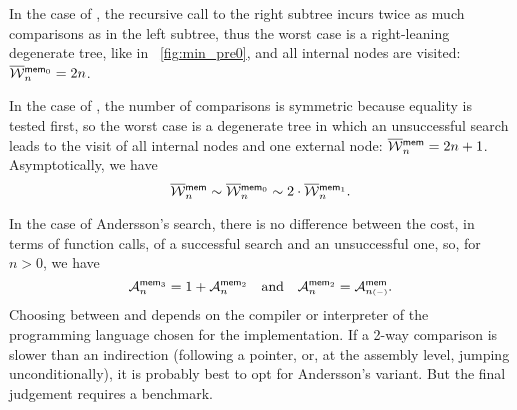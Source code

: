 In the case of , the recursive call to the right
subtree incurs twice as much comparisons as in the left subtree, thus
the worst case is a right\hyp{}leaning degenerate tree, like in
\fig~\vref{fig:min_pre0}, and all internal nodes are visited:
\(\OW{\fun{mem}_0}{n} = 2n\).

In the case of , the number of comparisons is symmetric
because equality is tested first, so the worst case is a degenerate
tree in which an unsuccessful search leads to the visit of all
internal nodes and one external node: \(\OW{\fun{mem}}{n} = 2n +
1\). Asymptotically, we have
\begin{equation*}
\OW{\fun{mem}}{n} \sim \OW{\fun{mem}_0}{n} 
\sim 2 \cdot \OW{\fun{mem}_1}{n}.
\end{equation*}

In the case of Andersson's search, there is no difference between the
cost, in terms of function calls, of a successful search and an
unsuccessful one, so, for \(n > 0\), we have
\begin{equation}
\M{\fun{mem}_3}{n} = 1 + \M{\fun{mem}_2}{n}\quad\text{and}\quad
\M{\fun{mem}_2}{n} = \M{\fun{mem}}{n{\scriptscriptstyle (-)}}.
\label{eq:Andersson_average}
\index{mem3@$\M{\fun{mem}_3}{n}$}\index{mem2@$\M{\fun{mem}_2}{n}$}
\end{equation}
Choosing between  and  depends on
the compiler or interpreter of the programming language chosen for the
implementation. If a 2-way comparison is slower than an indirection
(following a pointer, or, at the assembly level, jumping
unconditionally), it is probably best to opt for Andersson's
variant. But the final judgement requires a benchmark.

